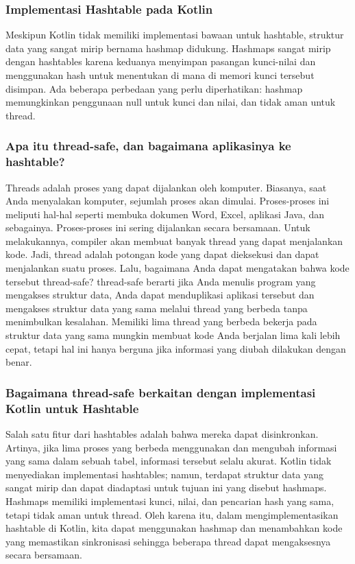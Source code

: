 \documentclass{article}
\begin{document}
\subsubsection{Implementasi Hashtable pada Kotlin}
Meskipun Kotlin tidak memiliki implementasi bawaan untuk hashtable, struktur data yang sangat mirip bernama hashmap didukung. Hashmaps sangat mirip dengan hashtables karena keduanya menyimpan pasangan kunci-nilai dan menggunakan hash untuk menentukan di mana di memori kunci tersebut disimpan. Ada beberapa perbedaan yang perlu diperhatikan: hashmap memungkinkan penggunaan null untuk kunci dan nilai, dan tidak aman untuk thread.

\subsubsection{Apa itu thread-safe, dan bagaimana aplikasinya ke hashtable?}
Threads adalah proses yang dapat dijalankan oleh komputer. Biasanya, saat Anda menyalakan komputer, sejumlah proses akan dimulai. Proses-proses ini meliputi hal-hal seperti membuka dokumen Word, Excel, aplikasi Java, dan sebagainya. Proses-proses ini sering dijalankan secara bersamaan. Untuk melakukannya, compiler akan membuat banyak thread yang dapat menjalankan kode. Jadi, thread adalah potongan kode yang dapat dieksekusi dan dapat menjalankan suatu proses. Lalu, bagaimana Anda dapat mengatakan bahwa kode tersebut thread-safe? thread-safe berarti jika Anda menulis program yang mengakses struktur data, Anda dapat menduplikasi aplikasi tersebut dan mengakses struktur data yang sama melalui thread yang berbeda tanpa menimbulkan kesalahan. Memiliki lima thread yang berbeda bekerja pada struktur data yang sama mungkin membuat kode Anda berjalan lima kali lebih cepat, tetapi hal ini hanya berguna jika informasi yang diubah dilakukan dengan benar.

\subsubsection{Bagaimana thread-safe berkaitan dengan implementasi Kotlin untuk Hashtable}
Salah satu fitur dari hashtables adalah bahwa mereka dapat disinkronkan. Artinya, jika lima proses yang berbeda menggunakan dan mengubah informasi yang sama dalam sebuah tabel, informasi tersebut selalu akurat. Kotlin tidak menyediakan implementasi hashtables; namun, terdapat struktur data yang sangat mirip dan dapat diadaptasi untuk tujuan ini yang disebut hashmaps. Hashmaps memiliki implementasi kunci, nilai, dan pencarian hash yang sama, tetapi tidak aman untuk thread. Oleh karena itu, dalam mengimplementasikan hashtable di Kotlin, kita dapat menggunakan hashmap dan menambahkan kode yang memastikan sinkronisasi sehingga beberapa thread dapat mengaksesnya secara bersamaan.
\end{document}
